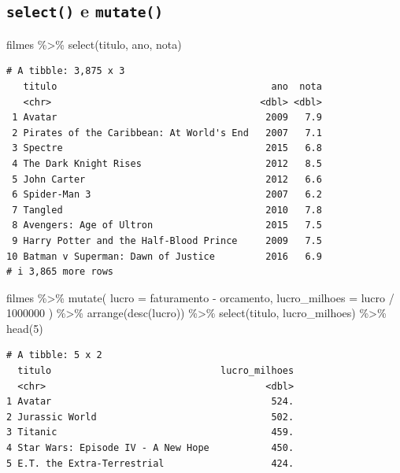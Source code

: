 \documentclass[
  letterpaper,
]{scrbook}
\newenvironment{Shaded}{\begin{snugshade}}{\end{snugshade}}
\newcommand{\AttributeTok}[1]{\textcolor[rgb]{0.40,0.45,0.13}{#1}}
\newcommand{\DecValTok}[1]{\textcolor[rgb]{0.68,0.00,0.00}{#1}}
\newcommand{\FunctionTok}[1]{\textcolor[rgb]{0.28,0.35,0.67}{#1}}
\newcommand{\NormalTok}[1]{\textcolor[rgb]{0.00,0.23,0.31}{#1}}
\newcommand{\SpecialCharTok}[1]{\textcolor[rgb]{0.37,0.37,0.37}{#1}}
\begin{document}
\subsection{\texorpdfstring{\texttt{select()} e
\texttt{mutate()}}{select() e mutate()}}\label{select-e-mutate}

\begin{Shaded}
\begin{Highlighting}[]
\NormalTok{filmes }\SpecialCharTok{\%\textgreater{}\%} \FunctionTok{select}\NormalTok{(titulo, ano, nota)}
\end{Highlighting}
\end{Shaded}

\begin{verbatim}
# A tibble: 3,875 x 3
   titulo                                      ano  nota
   <chr>                                     <dbl> <dbl>
 1 Avatar                                     2009   7.9
 2 Pirates of the Caribbean: At World's End   2007   7.1
 3 Spectre                                    2015   6.8
 4 The Dark Knight Rises                      2012   8.5
 5 John Carter                                2012   6.6
 6 Spider-Man 3                               2007   6.2
 7 Tangled                                    2010   7.8
 8 Avengers: Age of Ultron                    2015   7.5
 9 Harry Potter and the Half-Blood Prince     2009   7.5
10 Batman v Superman: Dawn of Justice         2016   6.9
# i 3,865 more rows
\end{verbatim}

\begin{Shaded}
\begin{Highlighting}[]
\NormalTok{filmes }\SpecialCharTok{\%\textgreater{}\%}
  \FunctionTok{mutate}\NormalTok{(}
    \AttributeTok{lucro =}\NormalTok{ faturamento }\SpecialCharTok{{-}}\NormalTok{ orcamento,}
    \AttributeTok{lucro\_milhoes =}\NormalTok{ lucro }\SpecialCharTok{/} \DecValTok{1000000}
\NormalTok{  ) }\SpecialCharTok{\%\textgreater{}\%}
  \FunctionTok{arrange}\NormalTok{(}\FunctionTok{desc}\NormalTok{(lucro)) }\SpecialCharTok{\%\textgreater{}\%}
  \FunctionTok{select}\NormalTok{(titulo, lucro\_milhoes) }\SpecialCharTok{\%\textgreater{}\%}
  \FunctionTok{head}\NormalTok{(}\DecValTok{5}\NormalTok{)}
\end{Highlighting}
\end{Shaded}

\begin{verbatim}
# A tibble: 5 x 2
  titulo                              lucro_milhoes
  <chr>                                       <dbl>
1 Avatar                                       524.
2 Jurassic World                               502.
3 Titanic                                      459.
4 Star Wars: Episode IV - A New Hope           450.
5 E.T. the Extra-Terrestrial                   424.
\end{verbatim}
\end{document}
